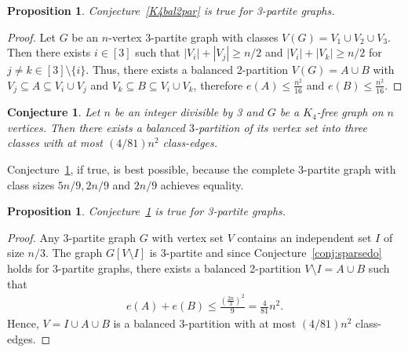 \documentclass[11pt]{article}
\newtheorem{prop}[theo]{Proposition}
\newtheorem{conj}[theo]{Conjecture}
\theoremstyle{definition}
\numberwithin{theo}{section}
\begin{document}
 
\begin{prop}
Conjecture~\ref{K4bal2par} is true for 3-partite graphs. 
\end{prop}
\begin{proof}
Let $G$ be an $n$-vertex $3$-partite graph with classes $V(G)=V_1\cup V_2\cup V_3$. Then there exists $i\in[3]$ such that $|V_i|+|V_j|\geq n/2$ and $|V_i|+|V_k|\geq n/2$ for $j\neq k\in [3]\setminus \{i\}$. Thus, there exists a balanced 2-partition $V(G)=A\cup B$ with $V_j\subseteq A\subseteq V_i\cup V_j$ and $V_k \subseteq B\subseteq V_i\cup V_k$, therefore $e(A)\leq \frac{n^2}{16}$ and $e(B)\leq \frac{n^2}{16}$. 
\end{proof}

\begin{conj}
\label{K4bal3par}
Let $n$ be an integer divisible by 3 and $G$ be a $K_4$-free graph on $n$ vertices. Then there exists a balanced $3$-partition of its vertex set into three classes with at most $(4/81)n^2$ class-edges.
\end{conj}
Conjecture~\ref{K4bal3par}, if true, is best possible, because the complete 3-partite graph with class sizes $5n/9,2n/9$ and $2n/9$ achieves equality. 
\begin{prop}
Conjecture~\ref{K4bal3par} is true for 3-partite graphs. 
\end{prop}
\begin{proof}
Any 3-partite graph $G$ with vertex set $V$ contains an independent set $I$ of size $n/3$. The graph $G[V\setminus I]$ is 3-partite and since Conjecture~\ref{conj:sparsedo} holds for 3-partite graphs, there exists a balanced 2-partition $V\setminus I=A\cup B$ such that
\begin{align*}
    e(A)+e(B)\leq \frac{\left(\frac{2n}{3}\right)^2}{9}=\frac{4}{81}n^2.
\end{align*}
Hence, $V=I\cup A\cup B$ is a balanced 3-partition with at most $(4/81)n^2$ class-edges. 
\end{proof}
\end{document}

